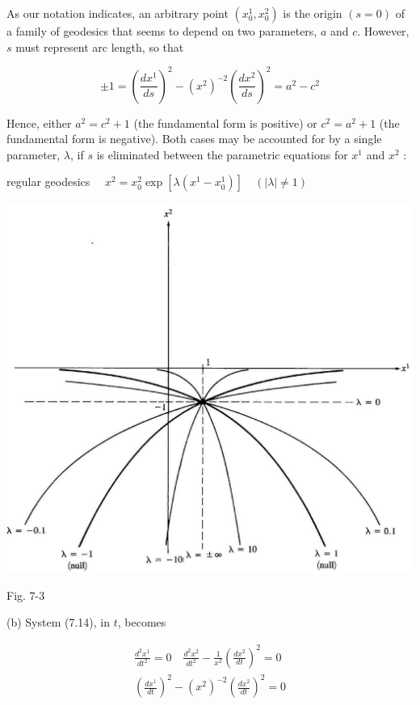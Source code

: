 \documentclass[10pt]{article}
\begin{document}
As our notation indicates, an arbitrary point $\left(x_{0}^{1}, x_{0}^{2}\right)$ is the origin $(s=0)$ of a family of geodesics that seems to depend on two parameters, $a$ and $c$. However, $s$ must represent arc length, so that

$$
\pm 1=\left(\frac{d x^{1}}{d s}\right)^{2}-\left(x^{2}\right)^{-2}\left(\frac{d x^{2}}{d s}\right)^{2}=a^{2}-c^{2}
$$

Hence, either $a^{2}=c^{2}+1$ (the fundamental form is positive) or $c^{2}=a^{2}+1$ (the fundamental form is negative). Both cases may be accounted for by a single parameter, $\lambda$, if $s$ is eliminated between the parametric equations for $x^{1}$ and $x^{2}$ :

regular geodesics $\quad x^{2}=x_{0}^{2} \exp \left[\lambda\left(x^{1}-x_{0}^{1}\right)\right] \quad(|\lambda| \neq 1)$

\begin{center}
\includegraphics[max width=\textwidth]{2024_04_03_41f90be4f896e21f0dc9g-107}
\end{center}

Fig. 7-3

(b) System (7.14), in $t$, becomes

$$
\begin{gathered}
\frac{d^{2} x^{1}}{d t^{2}}=0 \quad \frac{d^{2} x^{2}}{d t^{2}}-\frac{1}{x^{2}}\left(\frac{d x^{2}}{d t}\right)^{2}=0 \\
\left(\frac{d x^{1}}{d t}\right)^{2}-\left(x^{2}\right)^{-2}\left(\frac{d x^{2}}{d t}\right)^{2}=0
\end{gathered}
$$
\end{document}
